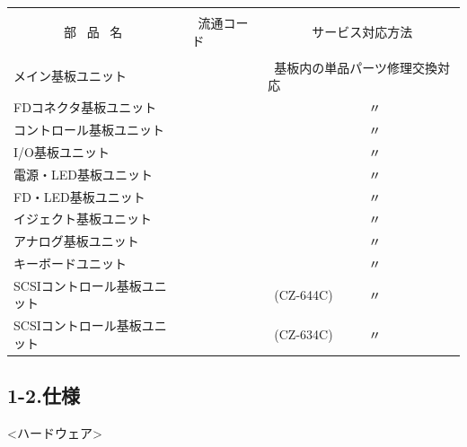 \documentclass[twoside,a4paper,12pt]{article}
\begin{document}
\setlength{\arrayrulewidth}{0.5mm}
\setlength{\tabcolsep}{2mm}
\begin{tabular}{|p{55mm}|p{40mm}|p{62mm}|}
\hline
& & \\[-2mm]
\ \ \ \ \ \ \ \ 部 \ 品 \ 名 & \ 流通コード & \ \ \ \ \ \ \ サービス対応方法\\
\hline
& & \\[-4mm]
メイン基板ユニット & & \ 基板内の単品パーツ修理交換対応\\
FDコネクタ基板ユニット & & \ \ \ \ \ \ \ \ \ \ \ \ \ \ \ \ 〃\\
コントロール基板ユニット & & \ \ \ \ \ \ \ \ \ \ \ \ \ \ \ \ 〃\\
I/O基板ユニット & & \ \ \ \ \ \ \ \ \ \ \ \ \ \ \ \ 〃\\
電源・LED基板ユニット & & \ \ \ \ \ \ \ \ \ \ \ \ \ \ \ \ 〃\\
FD・LED基板ユニット & & \ \ \ \ \ \ \ \ \ \ \ \ \ \ \ \ 〃\\
イジェクト基板ユニット & & \ \ \ \ \ \ \ \ \ \ \ \ \ \ \ \ 〃\\
アナログ基板ユニット & & \ \ \ \ \ \ \ \ \ \ \ \ \ \ \ \ 〃\\
キーボードユニット & & \ \ \ \ \ \ \ \ \ \ \ \ \ \ \ \ 〃\\
SCSIコントロール基板ユニット & & \ (CZ-644C) \ \ \ \ \ 〃\\
SCSIコントロール基板ユニット & & \ (CZ-634C) \ \ \ \ \ 〃\\[4mm]
\hline
\end{tabular}

\newpage

\subsection*{1-2.仕様}

<ハードウェア>
\end{document}
